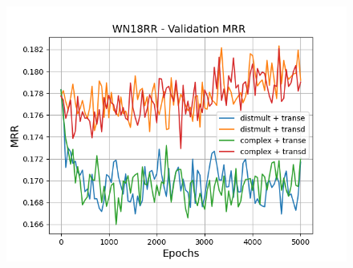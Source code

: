\begin{figure}
\begin{minipage}{.3\textwidth}
    \end{minipage}
    \begin{minipage}{.3\textwidth}
      \centering
      \includegraphics[width=\linewidth]{figures/results/gan_train/pretrained/uncertainty/max_distribution/entropy/wn18rr/gan_train_uncertainty_wn18rr_mrrs.png}
    \end{minipage}%
    

\end{figure}
